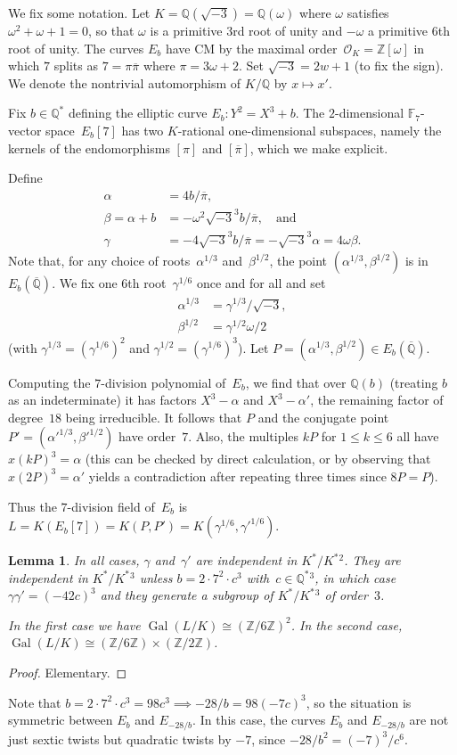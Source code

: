 \documentclass[12pt]{amsart}
\newcommand{\F}{\mathbb{F}}
\newcommand{\Q}{\mathbb{Q}}
\newcommand{\Z}{\mathbb{Z}}
\newcommand{\Qbar}{{\overline{\Q}}}
\newcommand{\OO}{\mathscr{O}}
\DeclareMathOperator{\Gal}{Gal}
\def\w{\omega}
\def\r3{\sqrt{-3}}
\def\pibar{\overline{\pi}}
\numberwithin{equation}{section}
\newtheorem{lemma}[theorem]{Lemma}
\theoremstyle{definition}
\theoremstyle{remark}
\begin{document}
We fix some notation. Let $K=\Q(\r3)=\Q(\w)$ where $\w$ satisfies
$\w^2+\w+1=0$, so that $\w$ is a primitive $3$rd root of
unity and $-\w$ a primitive $6$th root of unity.  The
curves $E_b$ have CM by the maximal order~$\OO_K=\Z[\w]$ in which
$7$ splits as $7=\pi\pibar$ where $\pi=3\w+2$.  Set
$\r3=2w+1$ (to fix the sign).  We denote the nontrivial
automorphism of $K/\Q$ by $x\mapsto x'$.

Fix $b\in\Q^*$ defining the elliptic curve $E_b: Y^2=X^3+b$.  The
$2$-dimensional $\F_7$-vector space~$E_b[7]$ has two $K$-rational
one-dimensional subspaces, namely the kernels of the endomorphisms
$[\pi]$ and $[\pibar]$, which we make explicit.

Define
\begin{align}
\alpha&=4b/\pibar,\\
\beta=\alpha+b&=-\w^2\r3^3b/\pibar,\quad\text{and}\\
\gamma&=-4\r3^3b/\pibar = -\r3^3\alpha = 4\w\beta.
\end{align}
Note that, for any choice of roots~$\alpha^{1/3}$ and~$\beta^{1/2}$, the point $(\alpha^{1/3},\beta^{1/2})$ is 
in~$E_b(\Qbar)$.  We fix one $6$th 
root~$\gamma^{1/6}$ once and for all
and set
\begin{align}
\alpha^{1/3} &= \gamma^{1/3}/\r3,\\
\beta^{1/2} &= \gamma^{1/2}\w/2
\end{align}
(with $\gamma^{1/3}=(\gamma^{1/6})^2$ and $\gamma^{1/2}=(\gamma^{1/6})^3$).  Let
$P=(\alpha^{1/3},\beta^{1/2})\in E_b(\Qbar)$.

Computing the $7$-division polynomial of~$E_b$, we find that over
$\Q(b)$ (treating $b$ as an indeterminate) it has factors $X^3-\alpha$
and $X^3-\alpha'$, the remaining factor of degree~$18$ being
irreducible.  It follows that $P$ and the conjugate point
$P'=(\alpha'^{1/3},\beta'^{1/2})$ have order~$7$.  Also, the multiples
$kP$ for $1\le k\le6$ all have $x(kP)^3=\alpha$ (this can be checked
by direct calculation, or by observing that $x(2P)^3=\alpha'$ yields a
contradiction after repeating three times since $8P=P$).

Thus the $7$-division field of~$E_b$ is
$L=K(E_b[7])=K(P,P')=K(\gamma^{1/6},\gamma'^{1/6})$.

\begin{lemma}In all cases, $\gamma$ and~$\gamma'$ are independent in
  $K^*/K^*{}^2$.  They are independent in $K^*/K^*{}^3$ unless
  $b=2\cdot7^2\cdot c^3$ with~$c\in\Q^*{}^3$, in which case
  $\gamma\gamma'=(-42c)^3$ and they generate a subgroup of $K^*/K^*{}^3$
  of order~$3$.

In the first case we have $\Gal(L/K)\cong(\Z/6\Z)^2$.  In the second
case, $\Gal(L/K)\cong(\Z/6\Z)\times(\Z/2\Z)$.
\end{lemma}
\begin{proof}
Elementary.
\end{proof}
Note that $b=2\cdot7^2\cdot c^3 = 98c^3\implies -28/b=98(-7c)^3$, so the situation is
symmetric between $E_b$ and $E_{-28/b}$.  In this case, the curves
$E_b$ and $E_{-28/b}$ are not just sextic twists but quadratic twists
by $-7$, since $-28/b^2=(-7)^3/c^6$.
\end{document}
